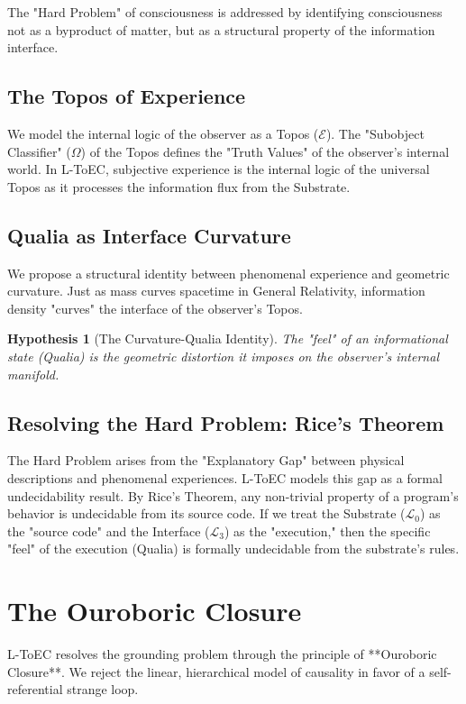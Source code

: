 \documentclass[11pt,titlepage]{article}
\newcommand{\substrate}{\mathcal{L}_0}
\newcommand{\interface}{\mathcal{L}_3}
\newcommand{\topos}{\mathcal{E}}
\newcommand{\classifier}{\Omega}
\newtheorem{hypothesis}{Hypothesis}[section]
\begin{document}
\label{sec:ltoc}
The "Hard Problem" of consciousness is addressed by identifying consciousness not as a byproduct of matter, but as a structural property of the information interface.

\subsection{The Topos of Experience}
We model the internal logic of the observer as a Topos ($\topos$). The "Subobject Classifier" ($\classifier$) of the Topos defines the "Truth Values" of the observer's internal world. In L-ToEC, subjective experience is the internal logic of the universal Topos as it processes the information flux from the Substrate.

\subsection{Qualia as Interface Curvature}
We propose a structural identity between phenomenal experience and geometric curvature. Just as mass curves spacetime in General Relativity, information density "curves" the interface of the observer's Topos.

\begin{hypothesis}[The Curvature-Qualia Identity]
The "feel" of an informational state (Qualia) is the geometric distortion it imposes on the observer's internal manifold.
\end{hypothesis}

\subsection{Resolving the Hard Problem: Rice's Theorem}
The Hard Problem arises from the "Explanatory Gap" between physical descriptions and phenomenal experiences. L-ToEC models this gap as a formal undecidability result. By Rice's Theorem, any non-trivial property of a program's behavior is undecidable from its source code. If we treat the Substrate ($\substrate$) as the "source code" and the Interface ($\interface$) as the "execution," then the specific "feel" of the execution (Qualia) is formally undecidable from the substrate's rules.


\section{The Ouroboric Closure}
\label{sec:ouroboros}
L-ToEC resolves the grounding problem through the principle of **Ouroboric Closure**. We reject the linear, hierarchical model of causality in favor of a self-referential strange loop.
\end{document}
